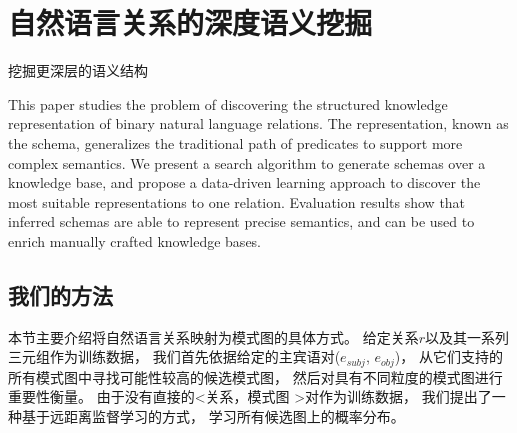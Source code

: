 
\chapter{自然语言关系的深度语义挖掘}
\label{chap:schema}

挖掘更深层的语义结构

This paper studies the problem of discovering the structured knowledge representation of binary natural language relations.
The representation, known as the schema, generalizes the traditional path of predicates to support more complex semantics.
We present a search algorithm to generate schemas over a knowledge base,
and propose a data-driven learning approach to discover the most suitable representations to one relation.
Evaluation results show that inferred schemas are able to represent precise semantics,
and can be used to enrich manually crafted knowledge bases.






\section{我们的方法}
\label{sec:schema-approach}

本节主要介绍将自然语言关系映射为模式图的具体方式。
给定关系$r$以及其一系列三元组作为训练数据，
我们首先依据给定的主宾语对($e_{subj}$, $e_{obj}$)，
从它们支持的所有模式图中寻找可能性较高的候选模式图，
然后对具有不同粒度的模式图进行重要性衡量。
由于没有直接的\textless 关系，模式图 \textgreater 对作为训练数据，
我们提出了一种基于远距离监督学习的方式，
学习所有候选图上的概率分布。








